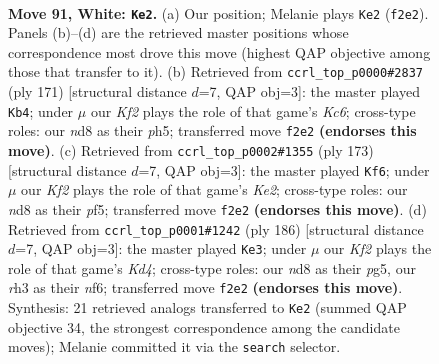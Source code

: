 \documentclass[11pt]{article}
\begin{document}
\clearpage

\begin{figure}[p]\centering
\begin{subfigure}{0.46\textwidth}\centering
\resizebox{\linewidth}{!}{%
\newchessgame
\chessboard[
  setfen={3n1k2/8/P5R1/8/8/7r/5K2/8 w - - 9 91},
  showmover=false,
  pgfstyle=straightmove, color=movearrow, markmove={f2-e2}
]}
\caption{}
\end{subfigure}\hfill
\begin{subfigure}{0.46\textwidth}\centering
\resizebox{\linewidth}{!}{%
\newchessgame
\chessboard[
  setfen={R7/8/8/7P/5K2/2k5/p5r1/8 b - - 6 86},
  showmover=false,
  pgfstyle=straightmove, color=movearrow, markmove={c3-b4}
]}
\caption{}
\end{subfigure}
\\[4pt]
\begin{subfigure}{0.46\textwidth}\centering
\resizebox{\linewidth}{!}{%
\newchessgame
\chessboard[
  setfen={2R5/4k3/8/5P2/8/2p4r/5K2/8 b - - 0 87},
  showmover=false,
  pgfstyle=straightmove, color=movearrow, markmove={e7-f6}
]}
\caption{}
\end{subfigure}\hfill
\begin{subfigure}{0.46\textwidth}\centering
\resizebox{\linewidth}{!}{%
\newchessgame
\chessboard[
  setfen={8/8/3k1n2/6p1/3K2P1/8/8/6R1 w - - 49 94},
  showmover=false,
  pgfstyle=straightmove, color=movearrow, markmove={d4-e3}
]}
\caption{}
\end{subfigure}
\caption{\textbf{Move 91, White: \texttt{Ke2}.} (a) Our position; Melanie plays \texttt{Ke2} (\texttt{f2e2}). Panels (b)--(d) are the retrieved master positions whose correspondence most drove this move (highest QAP objective among those that transfer to it). (b) Retrieved from \texttt{ccrl\_top\_p0000\#2837} (ply 171) [structural distance $d$=7, QAP obj=3]: the master played \texttt{Kb4}; under $\mu$ our \emph{Kf2} plays the role of that game's \emph{Kc6}; cross-type roles: our \emph{n}d8 as their \emph{p}h5; transferred move \texttt{f2e2} \textbf{(endorses this move)}. (c) Retrieved from \texttt{ccrl\_top\_p0002\#1355} (ply 173) [structural distance $d$=7, QAP obj=3]: the master played \texttt{Kf6}; under $\mu$ our \emph{Kf2} plays the role of that game's \emph{Ke2}; cross-type roles: our \emph{n}d8 as their \emph{p}f5; transferred move \texttt{f2e2} \textbf{(endorses this move)}. (d) Retrieved from \texttt{ccrl\_top\_p0001\#1242} (ply 186) [structural distance $d$=7, QAP obj=3]: the master played \texttt{Ke3}; under $\mu$ our \emph{Kf2} plays the role of that game's \emph{Kd4}; cross-type roles: our \emph{n}d8 as their \emph{p}g5, our \emph{r}h3 as their \emph{n}f6; transferred move \texttt{f2e2} \textbf{(endorses this move)}. Synthesis: 21 retrieved analogs transferred to \texttt{Ke2} (summed QAP objective 34, the strongest correspondence among the candidate moves); Melanie committed it via the \texttt{search} selector.}
\label{fig:thought-m180}
\end{figure}
\end{document}
